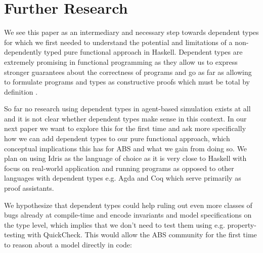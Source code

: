 \section{Further Research}
\label{sec:further_research}
We see this paper as an intermediary and necessary step towards dependent types for which we first needed to understand the potential and limitations of a non-dependently typed pure functional approach in Haskell. Dependent types are extremely promising in functional programming as they allow us to express stronger guarantees about the correctness of programs and go as far as allowing to formulate programs and types as constructive proofs which must be total by definition \cite{thompson_type_1991, mckinna_why_2006, altenkirch_pi_2010}.

So far no research using dependent types in agent-based simulation exists at all and it is not clear whether dependent types make sense in this context. In our next paper we want to explore this for the first time and ask more specifically how we can add dependent types to our pure functional approach, which conceptual implications this has for ABS and what we gain from doing so. We plan on using Idris \cite{brady_idris_2013} as the language of choice as it is very close to Haskell with focus on real-world application and running programs as opposed to other languages with dependent types e.g. Agda and Coq which serve primarily as proof assistants.

We hypothesize that dependent types could help ruling out even more classes of bugs already at compile-time and encode invariants and model specifications on the type level, which implies that we don't need to test them using e.g. property-testing with QuickCheck. This would allow the ABS community for the first time to reason about a model directly in code:

